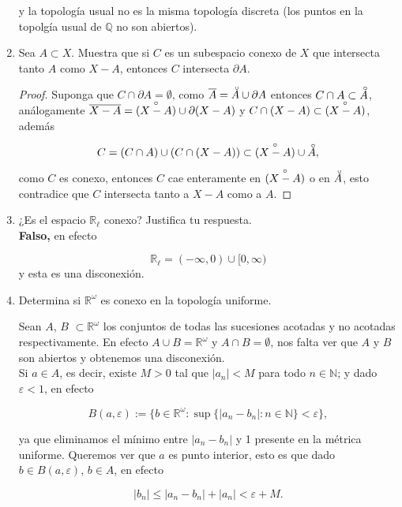 \documentclass[12bpt]{article}
\newcommand{\interior}[1]{\accentset{\smash{\raisebox{-0.12ex}{$\scriptstyle\circ$}}}{#1}\rule{0pt}{2.3ex}}
\begin{document}
\begin{enumerate}
y la topología usual  no es la misma topología discreta (los puntos en la topolgía usual de $\mathbb{Q}$ no son abiertos).

    \item Sea $A \subset X$. Muestra que si $C$ es un subespacio conexo de $X$ que intersecta tanto $A$ como $X - A$, entonces $C$ intersecta $\partial A$.

    \begin{proof}
        Suponga que $C\cap \partial A=\emptyset$, como $\overline{A}=\interior{A}\cup \partial A$ entonces $C\cap A\subset \interior{A}$, análogamente $\overline{X-A}=\interior{(X-A)}\cup \partial (X-A)$  y $C\cap (X-A)\subset \interior{(X-A)}$, además

        $$C=(C\cap A) \cup (C\cap (X-A))\subset \interior{(X-A)}\cup \interior{A},$$

        como $C$ es conexo, entonces $C$ cae enteramente en $\interior{(X-A)}$ o en $\interior{A}$, esto contradice que $C$ intersecta tanto a $X-A$ como a $A$.
    \end{proof}
    
    \item ¿Es el espacio $\mathbb{R}_\ell$ conexo? Justifica tu respuesta.\\
    
    \textbf{Falso,} en efecto 

    $$\mathbb{R}_{\ell}=(-\infty,0)\cup [0,\infty)$$
     y esta es una disconexión.

    \item Determina si $\mathbb{R}^\omega$ es conexo en la topología uniforme.


Sean $A$, $B$ $\subset\mathbb{R}^\omega$ los conjuntos de todas las sucesiones acotadas y  no acotadas respectivamente. En efecto $A \cup B = \mathbb{R}^\omega$ y $A \cap B = \emptyset$, nos falta ver que $A$ y $B$ son abiertos y obtenemos una disconexión.\\

Si $a \in A$, es decir, existe $M>0$ tal que $|a_n|<M$ para todo $n \in \mathbb{N}$; y dado $\varepsilon<1$, en efecto

$$B(a,\varepsilon):=\{b\in\mathbb{R}^{\omega}:\sup\{|a_n-b_n|:n\in\mathbb{N}\}<\varepsilon\},$$

ya que eliminamos el mínimo entre $|a_n-b_n|$ y 1 presente en la métrica uniforme. Queremos ver que $a$ es punto interior, esto es que dado $b\in B(a,\varepsilon)$, $b\in A$, en efecto

$$|b_n|\leq |a_n-b_n|+|a_n|<\varepsilon+M.$$


\end{enumerate}
\end{document}
